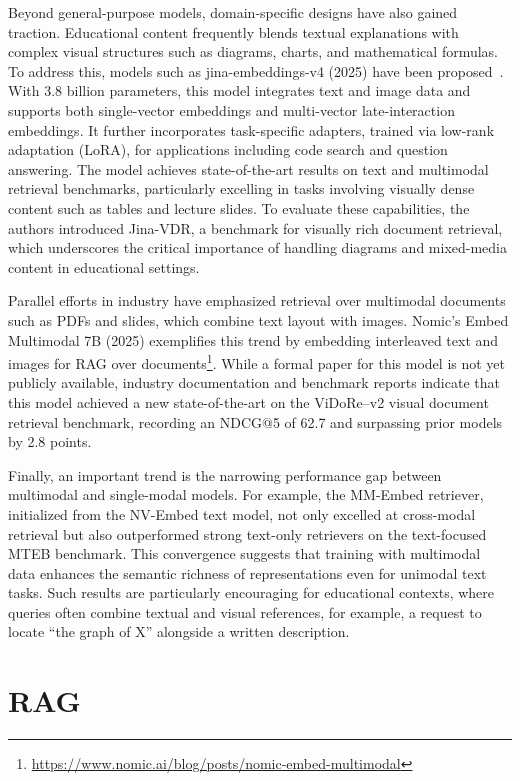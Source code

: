 Beyond general-purpose models, domain-specific designs have also gained traction. Educational content frequently blends textual explanations with complex visual structures such as diagrams, charts, and mathematical formulas. To address this, models such as jina-embeddings-v4 (2025) have been proposed~\cite{guenther2025jinaembeddingsv4}. With 3.8 billion parameters, this model integrates text and image data and supports both single-vector embeddings and multi-vector late-interaction embeddings. It further incorporates task-specific adapters, trained via low-rank adaptation (LoRA), for applications including code search and question answering. The model achieves state-of-the-art results on text and multimodal retrieval benchmarks, particularly excelling in tasks involving visually dense content such as tables and lecture slides. To evaluate these capabilities, the authors introduced Jina-VDR, a benchmark for visually rich document retrieval, which underscores the critical importance of handling diagrams and mixed-media content in educational settings.

Parallel efforts in industry have emphasized retrieval over multimodal documents such as PDFs and slides, which combine text layout with images. Nomic's Embed Multimodal 7B (2025) exemplifies this trend by embedding interleaved text and images for RAG over documents\footnote{\url{https://www.nomic.ai/blog/posts/nomic-embed-multimodal}}. While a formal paper for this model is not yet publicly available, industry documentation and benchmark reports indicate that this model achieved a new state-of-the-art on the ViDoRe–v2 visual document retrieval benchmark, recording an NDCG@5 of 62.7 and surpassing prior models by 2.8 points.

Finally, an important trend is the narrowing performance gap between multimodal and single-modal models. For example, the MM-Embed retriever, initialized from the NV-Embed text model, not only excelled at cross-modal retrieval but also outperformed strong text-only retrievers on the text-focused MTEB benchmark. This convergence suggests that training with multimodal data enhances the semantic richness of representations even for unimodal text tasks. Such results are particularly encouraging for educational contexts, where queries often combine textual and visual references, for example, a request to locate “the graph of X” alongside a written description.


\section{RAG}

